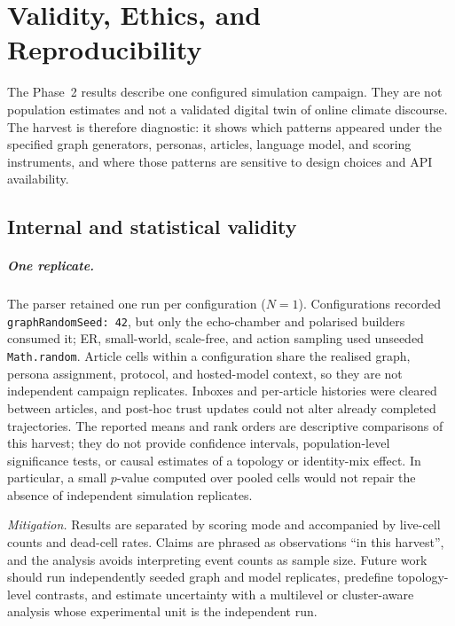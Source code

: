 \chapter{Validity, Ethics, and Reproducibility}
\label{chap:limitations}

The Phase~2 results describe one configured simulation campaign. They are not
population estimates and not a validated digital twin of online climate
discourse. The harvest is therefore diagnostic: it shows which patterns
appeared under the specified graph generators, personas, articles, language
model, and scoring instruments, and where those patterns are sensitive to
design choices and API availability.

\section{Internal and statistical validity}

\paragraph{One replicate.}
The parser retained one run per configuration ($N=1$). Configurations
recorded \texttt{graphRandomSeed: 42}, but only the echo-chamber and polarised
builders consumed it; ER, small-world, scale-free, and action sampling used
unseeded \texttt{Math.random}. Article cells within a configuration share the
realised graph, persona assignment, protocol, and hosted-model context, so they
are not independent campaign replicates. Inboxes and per-article histories
were cleared between articles, and post-hoc trust updates could not alter
already completed trajectories.  The reported means and rank orders are
descriptive comparisons of this harvest; they do not provide confidence
intervals, population-level significance tests, or causal estimates of a
topology or identity-mix effect.  In particular, a small \(p\)-value computed
over pooled cells would not repair the absence of independent simulation
replicates.

\emph{Mitigation.}  Results are separated by scoring mode and accompanied by
live-cell counts and dead-cell rates.  Claims are phrased as observations
\enquote{in this harvest}, and the analysis avoids interpreting event counts
as sample size.  Future work should run independently seeded graph and model
replicates, predefine topology-level contrasts, and estimate uncertainty with
a multilevel or cluster-aware analysis whose experimental unit is the
independent run.

